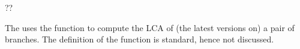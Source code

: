 \begin{theorem} 
??
\end{theorem}

The  uses the function  to compute the
LCA of (the latest versions on) a pair of branches. The definition of
the function is standard, hence not discussed. 
